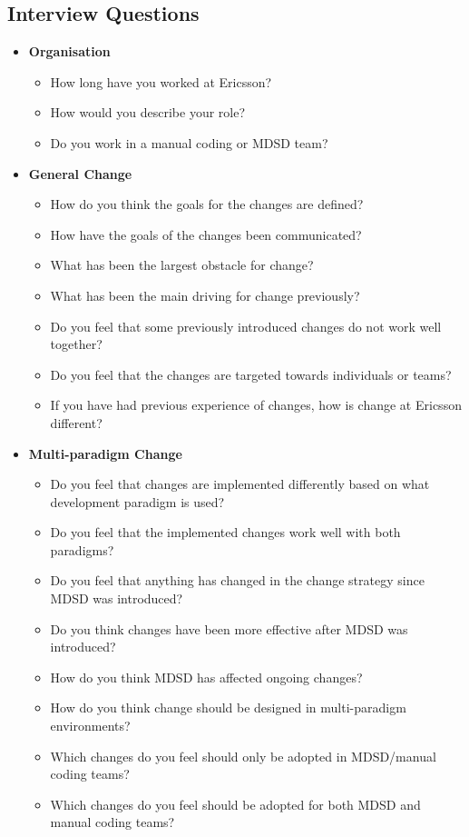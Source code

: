 \documentclass[10pt,twocolumn]{article}
\begin{document}
\newpage
\begin{appendices}

\section{Interview Questions}
\begin{itemize}
\item \textbf{Organisation}
\begin{itemize}
\item How long have you worked at Ericsson?
\item How would you describe your role?
\item Do you work in a manual coding or MDSD team?
\end{itemize}

\item \textbf{General Change}
\begin{itemize}
\item How do you think the goals for the changes are defined?
\item How have the goals of the changes been communicated? 
\item What has been the largest obstacle for change?
\item What has been the main driving for change previously?
\item Do you feel that some previously introduced changes do not work well together?
\item Do you feel that the changes are targeted towards individuals or teams? 
\item If you have had previous experience of changes, how is change at Ericsson different? 
\end{itemize}

\item \textbf{Multi-paradigm Change}
\begin{itemize}
\item Do you feel that changes are implemented differently based on what development paradigm is used?
\item Do you feel that the implemented changes work well with both paradigms? 
\item Do you feel that anything has changed in the change strategy since MDSD was introduced? 
\item Do you think changes have been more effective after MDSD was introduced? 
\item How do you think MDSD has affected ongoing changes?
\item How do you think change should be designed in multi-paradigm environments?
\item Which changes do you feel should only be adopted in MDSD/manual coding teams?
\item Which changes do you feel should be adopted for both MDSD and manual coding teams?
\end{itemize}

\end{itemize}

\end{appendices}
\end{document}
